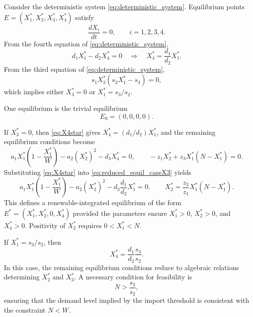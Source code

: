 \documentclass[11pt]{article}
\numberwithin{equation}{section}
\begin{document}
Consider the deterministic system \eqref{eq:deterministic_system}. Equilibrium points 
$E=(X_1^*,X_2^*,X_3^*,X_4^*)$ satisfy
\begin{equation}\label{eq:equil_cond}
\frac{dX_i}{dt}=0,\qquad i=1,2,3,4.
\end{equation}
From the fourth equation of \eqref{eq:deterministic_system},
\begin{equation}\label{eq:X4star}
d_1X_1^*-d_2X_4^*=0 \quad \Rightarrow \quad X_4^*=\frac{d_1}{d_2}X_1^* .
\end{equation}
From the third equation of \eqref{eq:deterministic_system},
\begin{equation}\label{eq:X3star_or_X1star}
s_1X_3^*(s_2X_1^*-s_3)=0,
\end{equation}
which implies either $X_3^*=0$ or $X_1^*=s_3/s_2$.

One equilibrium is the trivial equilibrium
\begin{equation}\label{eq:E0}
E_0=(0,0,0,0).
\end{equation}

If $X_3^*=0$, then \eqref{eq:X4star} gives $X_4^*=(d_1/d_2)X_1^*$, and the remaining equilibrium conditions become
\begin{equation}\label{eq:reduced_equil_caseX3}
a_1X_1^*\left(1-\frac{X_1^*}{W}\right)-a_2(X_2^*)^2-d_3X_4^*=0,
\qquad
-z_1X_2^*+z_3X_1^*(N-X_1^*)=0.
\end{equation}
Substituting \eqref{eq:X4star} into \eqref{eq:reduced_equil_caseX3} yields
\begin{equation}\label{eq:equil_Estar_caseX3}
a_1X_1^*\left(1-\frac{X_1^*}{W}\right)-a_2(X_2^*)^2-d_3\frac{d_1}{d_2}X_1^*=0,
\qquad
X_2^*=\frac{z_3}{z_1}X_1^*(N-X_1^*).
\end{equation}
This defines a renewable-integrated equilibrium of the form 
$E^*=(X_1^*,X_2^*,0,X_4^*)$ provided the parameters ensure $X_1^*>0$, $X_2^*>0$, and $X_4^*>0$. 
Positivity of $X_2^*$ requires $0<X_1^*<N$.

If $X_1^*=s_3/s_2$, then
\begin{equation}\label{eq:X4star_caseX1}
X_4^*=\frac{d_1}{d_2}\frac{s_3}{s_2}.
\end{equation}
In this case, the remaining equilibrium conditions reduce to algebraic relations determining $X_2^*$ and $X_3^*$. A necessary condition for feasibility is
\begin{equation}\label{eq:N_condition}
N>\frac{s_3}{s_2},
\end{equation}
ensuring that the demand level implied by the import threshold is consistent with the constraint $N<W$. 
\end{document}
